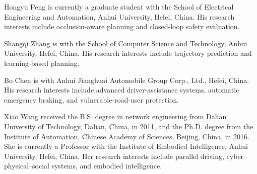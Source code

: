\documentclass[journal]{IEEEtran}
\begin{document}
\begin{IEEEbiographynophoto}{Hongyu Peng}
is currently a graduate student with the School of Electrical Engineering and Automation, Anhui University, Hefei, China. His research interests include occlusion-aware planning and closed-loop safety evaluation.
\end{IEEEbiographynophoto}

\begin{IEEEbiographynophoto}{Shangqi Zhang}
is with the School of Computer Science and Technology, Anhui University, Hefei, China. His research interests include trajectory prediction and learning-based planning.
\end{IEEEbiographynophoto}

\begin{IEEEbiographynophoto}{Bo Chen}
is with Anhui Jianghuai Automobile Group Corp., Ltd., Hefei, China. His research interests include advanced driver-assistance systems, automatic emergency braking, and vulnerable-road-user protection.
\end{IEEEbiographynophoto}

\begin{IEEEbiographynophoto}{Xiao Wang}
received the B.S. degree in network engineering from Dalian University of Technology, Dalian, China, in 2011, and the Ph.D. degree from the Institute of Automation, Chinese Academy of Sciences, Beijing, China, in 2016. She is currently a Professor with the Institute of Embodied Intelligence, Anhui University, Hefei, China. Her research interests include parallel driving, cyber--physical--social systems, and embodied intelligence.
\end{IEEEbiographynophoto}
\end{document}
